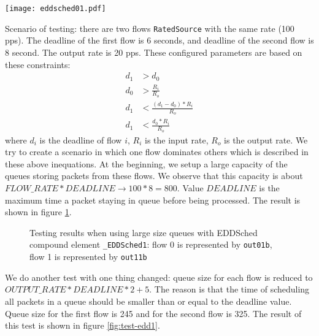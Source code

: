 \documentclass[a4paper]{article}
\begin{document}
        \begin{center}
	      \texttt{[image: eddsched01.pdf]}
	      \label{fig:eddsched01}
        \end{center}
        
        Scenario of testing: there are two flows \texttt{RatedSource} with the same rate (100 pps). The deadline of the first flow is 6 seconds, and deadline of the second flow is 8 second. The output rate is 20 pps. These configured parameters are based on these constraints:
        \begin{align}
          d_1 &> d_0 \\
         	d_0 &> \frac{R_i}{R_o}\\
         	d_1 &< \frac{(d_1 - d_0)*R_i}{R_o} \\
         	d_1 &< \frac{d_0*R_i}{R_o}
        \end{align} 
      	where $d_i$ is the deadline of flow $i$, $R_i$ is the input rate, $R_o$ is the output rate.
        We try to create a scenario in which one flow dominates others which is described in these above inequations. At the beginning, we setup a large capacity of the queues storing packets from these flows. We observe that this capacity is about $FLOW\_RATE * DEADLINE \to 100*8 = 800$. Value $DEADLINE$ is the maximum time a packet staying in queue before being processed. The result is shown in figure \ref{fig:test-edd-ideal}. \\
        \begin{figure}
          \centering
	          \caption{Testing results when using large size queues with EDDSched compound element \texttt{\_EDDSched1}: flow 0 is represented by \texttt{out01b}, flow 1 is represented by \texttt{out11b}}
	          \label{fig:test-edd-ideal}
        \end{figure}
        We do another test with one thing changed: queue size for each flow is reduced to $OUTPUT\_RATE * DEADLINE * 2 + 5$. The reason is that the time of scheduling all packets in a queue should be smaller than or equal to the deadline value. Queue size for the first flow is 245 and for the second flow is 325. The result of this test is shown in figure \ref{fig:test-edd1}.
\end{document}
